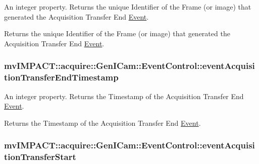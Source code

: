 An integer property. Returns the unique Identifier of the Frame (or image) that generated the Acquisition Transfer End \hyperlink{classmv_i_m_p_a_c_t_1_1acquire_1_1_event}{Event}. 

Returns the unique Identifier of the Frame (or image) that generated the Acquisition Transfer End \hyperlink{classmv_i_m_p_a_c_t_1_1acquire_1_1_event}{Event}. \hypertarget{classmv_i_m_p_a_c_t_1_1acquire_1_1_gen_i_cam_1_1_event_control_ac4bfe3db67cea2a631b32627150d357a}{
\subsubsection[{event\+Acquisition\+Transfer\+End\+Timestamp}]{ mv\+I\+M\+P\+A\+C\+T\+::acquire\+::\+Gen\+I\+Cam\+::\+Event\+Control\+::event\+Acquisition\+Transfer\+End\+Timestamp}}\label{classmv_i_m_p_a_c_t_1_1acquire_1_1_gen_i_cam_1_1_event_control_ac4bfe3db67cea2a631b32627150d357a}


An integer property. Returns the Timestamp of the Acquisition Transfer End \hyperlink{classmv_i_m_p_a_c_t_1_1acquire_1_1_event}{Event}. 

Returns the Timestamp of the Acquisition Transfer End \hyperlink{classmv_i_m_p_a_c_t_1_1acquire_1_1_event}{Event}. \hypertarget{classmv_i_m_p_a_c_t_1_1acquire_1_1_gen_i_cam_1_1_event_control_a23077eda757aa2b93dbe696973b4850b}{
\subsubsection[{event\+Acquisition\+Transfer\+Start}]{ mv\+I\+M\+P\+A\+C\+T\+::acquire\+::\+Gen\+I\+Cam\+::\+Event\+Control\+::event\+Acquisition\+Transfer\+Start}}\label{classmv_i_m_p_a_c_t_1_1acquire_1_1_gen_i_cam_1_1_event_control_a23077eda757aa2b93dbe696973b4850b}


